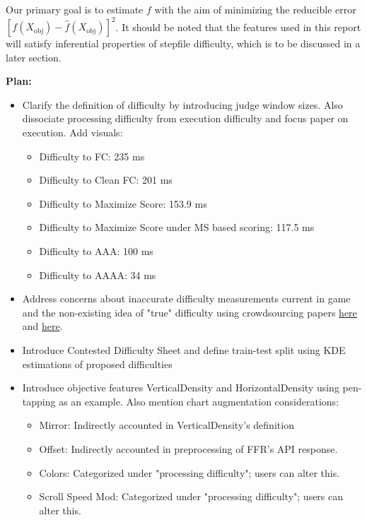 Our primary goal is to estimate $f$ with the aim of
minimizing the reducible error $[f(X_{\text{obj}}) - \hat{f}(X_{\text{obj}})]^2$. It should be noted that the features used in this report will satisfy inferential properties of stepfile difficulty, which is to be discussed in a later section.

\vspace{2mm}

\textbf{Plan:}
\begin{itemize}
	      	      
	\item Clarify the definition of difficulty by introducing judge window sizes. Also dissociate processing difficulty from execution difficulty and focus paper on execution. Add visuals:
	      \begin{itemize}
	      	\item Difficulty to FC: 235 ms
	      	\item Difficulty to Clean FC: 201 ms
	      	\item Difficulty to Maximize Score: 153.9 ms
	      	\item Difficulty to Maximize Score under MS based scoring: 117.5 ms
	      	\item Difficulty to AAA: 100 ms
	      	\item Difficulty to AAAA: 34 ms
	      \end{itemize}
	\item Address concerns about inaccurate difficulty measurements current in game and the non-existing idea of "true" difficulty using crowdsourcing papers \href{https://crowdsourcing-class.org/readings/downloads/quality-control/Quality-Management-on-Amazon-Mechanical-Turk.pdf#page4}{here} and \href{https://crowdsourcing-class.org/readings/downloads/ml/EM.pdf}{here}.
	      	      
	      \item{Introduce Contested Difficulty Sheet and define train-test split using KDE estimations of proposed difficulties}
	      	      
	      \item{Introduce objective features VerticalDensity and HorizontalDensity using pen-tapping as an example. Also mention chart augmentation considerations:}
	      \begin{itemize}
	      	\item Mirror: Indirectly accounted in VerticalDensity's definition
	      	\item Offset: Indirectly accounted in preprocessing of FFR's API response.
	      	\item Colors: Categorized under "processing difficulty"; users can alter this.
	      	\item Scroll Speed Mod: Categorized under "processing difficulty"; users can alter this.
	      \end{itemize}
	      	      

\end{itemize}
